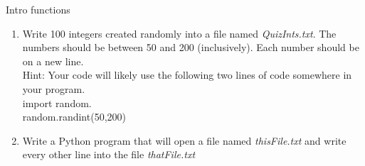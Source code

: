 \documentclass{article}
\newcommand{\tab}{\hspace*{0.25in}}
\begin{document}
\begin{flushright}
Intro functions\end{flushright}

\vspace*{-1.5em}
\noindent\makebox[\linewidth]{\rule{\paperwidth}{0.4pt}}


\vspace*{2em}

\begin{enumerate}



	\item 
		Write 100 integers created randomly into a file named \textit{QuizInts.txt}. 
		The numbers should be between 50 and 200 (inclusively). 
		Each number should be on a new line.\\
		Hint: Your code will likely use the following two lines of code somewhere in your program.\\
			\tab import random.\\
			\tab random.randint(50,200)

	\item 
		Write a Python program that will open a file named \textit{thisFile.txt} and write every 
		other line into the file
		\textit{thatFile.txt}


\end{enumerate}
\end{document}
